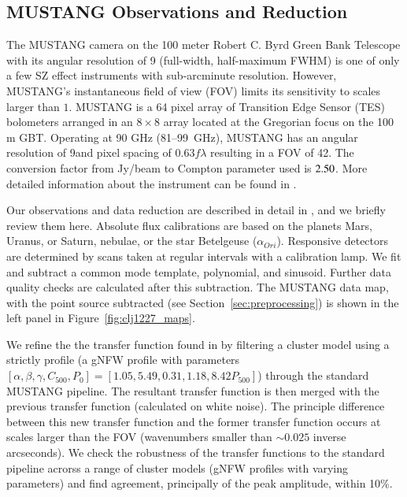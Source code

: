 \documentclass[twocolumn,traditabstract]{aa}
\begin{document}
\subsection{MUSTANG Observations and Reduction}
\label{sec:musobs}
The MUSTANG camera \citep{dicker2008}
on the 100 meter Robert C. Byrd Green Bank Telescope \citep[GBT, ][]{jewell2004} with its angular resolution of 9\asec 
(full-width, half-maximum FWHM) is one of only a few SZ effect instruments with sub-arcminute resolution.
However, MUSTANG's instantaneous field of view (FOV) limits its sensitivity to scales larger than $1$\amin.
MUSTANG is a 64 pixel array of Transition Edge Sensor (TES) bolometers arranged in an $8 \times 8$ array
located at the Gregorian focus on the 100 m GBT. Operating at 90 GHz (81--99~GHz),
MUSTANG has an angular resolution of 9\asec and pixel spacing of 0.63$f \lambda$ resulting in a FOV
of 42\asec. The conversion factor from Jy/beam to Compton parameter used is $\-2.50$.
More detailed information about the instrument can be found in \citet{dicker2008}. 

Our observations and data reduction are described in detail in \citet{romero2015a}, and we briefly review them
here. Absolute flux calibrations are based on the planets Mars, Uranus, or Saturn, nebulae, or the star Betelgeuse 
($\alpha_{Ori}$). Responsive detectors are determined by scans taken at regular intervals with a calibration lamp.
We fit and subtract a common mode template, polynomial, and sinusoid. Further data quality checks are calculated
after this subtraction. The MUSTANG data map, with the point source subtracted (see Section~\ref{sec:preprocessing})
is shown in the left panel in Figure~\ref{fig:clj1227_maps}.

We refine the the transfer function found in  \citet{romero2016} by filtering a cluster model using a strictly
 profile (a gNFW profile with parameters
$[\alpha,\beta,\gamma,C_{500},P_0]=[1.05,5.49,0.31,1.18,8.42 P_{500}]$) through the standard MUSTANG pipeline.
The resultant transfer function is then merged with the previous transfer function (calculated on white noise).
The principle difference between this new transfer function and the former transfer function
occurs at scales larger than the FOV (wavenumbers smaller than $\sim0.025$ inverse arcseconds).
We check the robustness of the transfer functions to the standard pipeline acrorss a range of cluster models
(gNFW profiles with varying parameters) and find agreement, principally of the peak amplitude, within 10\%.
\end{document}

